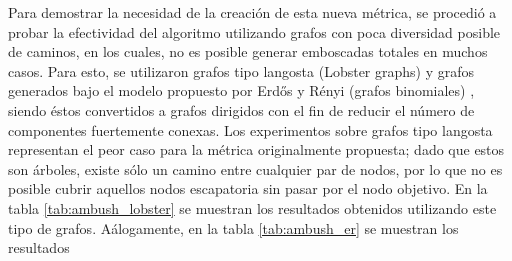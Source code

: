 Para demostrar la necesidad de la creaci\'on de esta nueva m\'etrica,
se procedi\'o a probar la efectividad del algoritmo utilizando grafos
con poca diversidad posible de caminos, en los cuales, no es posible
generar emboscadas totales en muchos casos. Para esto, se utilizaron
grafos tipo langosta (Lobster graphs) \cite{Gal09} y grafos generados
bajo el modelo propuesto por Erd\H{o}s y R{\'e}nyi (grafos binomiales)
\cite{ER59}, siendo \'estos convertidos a grafos dirigidos con el fin de
reducir el n\'umero de componentes fuertemente conexas. Los experimentos sobre
grafos tipo langosta representan el peor caso para la m\'etrica originalmente
propuesta; dado que estos son \'arboles, existe s\'olo un camino entre
cualquier par de nodos, por lo que no es posible cubrir aquellos nodos
escapatoria sin pasar por el nodo objetivo. En la tabla \ref{tab:ambush_lobster}
se muestran los resultados obtenidos utilizando este tipo de grafos.
A\'alogamente, en la tabla \ref{tab:ambush_er} se muestran los resultados

